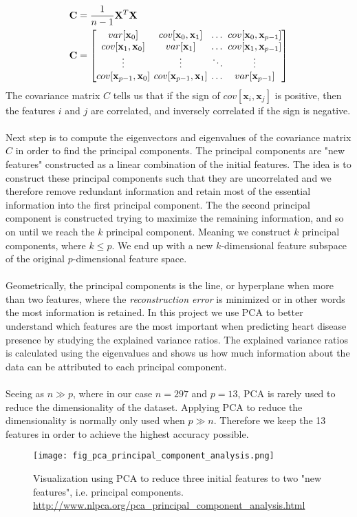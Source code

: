 \documentclass[a4paper,twocolumn]{article}
\newcommand{\X}{\mathbf{X}}
\begin{document}
\begin{align}
    \mathbf{C} &= \frac{1}{n - 1}\X^{T}\X\\
    \mathbf{C} &= \setlength\arraycolsep{2pt}\begin{bmatrix} 
    var[{\mathbf{x}_{0}}] & cov[\mathbf{x}_{0}, \mathbf{x}_{1}] & \dots & cov[\mathbf{x}_{0}, \mathbf{x}_{p-1}]\\
    cov[\mathbf{x}_{1}, \mathbf{x}_{0}] & var[\mathbf{x}_{1}] & \dots & cov[\mathbf{x}_{1}, \mathbf{x}_{p-1}]\\
    \vdots & \vdots & \ddots & \vdots\\
    cov[\mathbf{x}_{p-1}, \mathbf{x}_{0}] & cov[\mathbf{x}_{p-1}, \mathbf{x}_{1}] & \dots & var[{\mathbf{x}_{p-1}}]
    \end{bmatrix}
\end{align}
The covariance matrix $C$ tells us that if the sign of $cov[\mathbf{x}_{i}, \mathbf{x}_{j}]$ is positive, then the features $i$ and $j$ are correlated, and inversely correlated if the sign is negative.\\
\\
Next step is to compute the eigenvectors and eigenvalues of the covariance matrix $C$ in order to find the principal components. The principal components are "new features" constructed as a linear combination of the initial features. The idea is to construct these principal components such that they are uncorrelated and we therefore remove redundant information and retain most of the essential information into the first principal component. The the second principal component is constructed trying to maximize the remaining information, and so on until we reach the $k$ principal component. Meaning we construct $k$ principal components, where $k \leq p$. We end up with a new $k$-dimensional feature subspace of the original $p$-dimensional feature space.\\
\\
Geometrically, the principal components is the line, or hyperplane when more than two features, where the \textit{reconstruction error} is minimized\cite{hastie} or in other words the most information is retained. In this project we use PCA to better understand which features are the most important when predicting heart disease presence by studying the explained variance ratios. The explained variance ratios is calculated using the eigenvalues and shows us how much information about the data can be attributed to each principal component.\\
\\
Seeing as $n\gg p$, where in our case $n = 297$ and $p = 13$, PCA is rarely used to reduce the dimensionality of the dataset. Applying PCA to reduce the dimensionality is normally only used when $p \gg n$. Therefore we keep the 13 features in order to achieve the highest accuracy possible.
\begin{figure}[ht]
    \centering
    \texttt{[image: fig\_pca\_principal\_component\_analysis.png]}
    \caption{Visualization using PCA to reduce three initial features to two "new features", i.e. principal components. \href{http://www.nlpca.org/pca_principal_component_analysis.html}{http://www.nlpca.org/pca\_principal\_component\_analysis.html}}
    \label{fig:1}
\end{figure}
\end{document}
